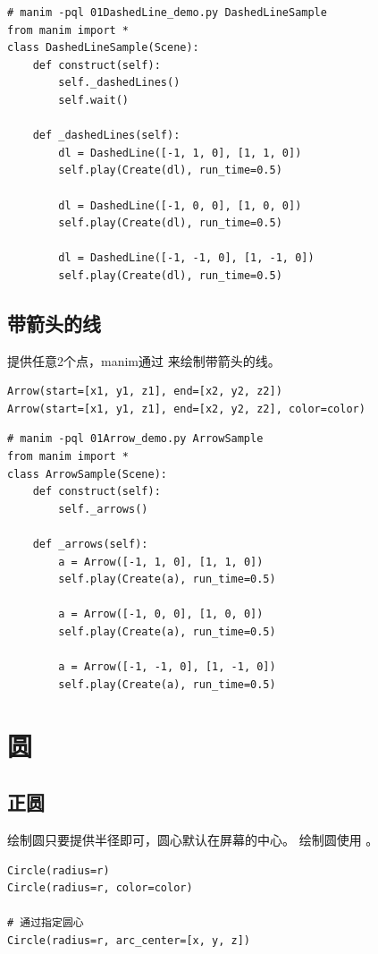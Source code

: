 \begin{lstlisting}[style=pythonstyle]
# manim -pql 01DashedLine_demo.py DashedLineSample    
from manim import *
class DashedLineSample(Scene):
    def construct(self):
        self._dashedLines()
        self.wait()

    def _dashedLines(self):
        dl = DashedLine([-1, 1, 0], [1, 1, 0])
        self.play(Create(dl), run_time=0.5)

        dl = DashedLine([-1, 0, 0], [1, 0, 0])
        self.play(Create(dl), run_time=0.5)

        dl = DashedLine([-1, -1, 0], [1, -1, 0])
        self.play(Create(dl), run_time=0.5)
\end{lstlisting}

\subsection{带箭头的线}
提供任意2个点，manim通过  来绘制带箭头的线。
\begin{lstlisting}[style=demostyle,numbers=none]
Arrow(start=[x1, y1, z1], end=[x2, y2, z2])
Arrow(start=[x1, y1, z1], end=[x2, y2, z2], color=color)
\end{lstlisting}

\begin{lstlisting}[style=pythonstyle]
# manim -pql 01Arrow_demo.py ArrowSample    
from manim import *
class ArrowSample(Scene):
    def construct(self):
        self._arrows()  

    def _arrows(self):
        a = Arrow([-1, 1, 0], [1, 1, 0])  
        self.play(Create(a), run_time=0.5)

        a = Arrow([-1, 0, 0], [1, 0, 0])  
        self.play(Create(a), run_time=0.5)

        a = Arrow([-1, -1, 0], [1, -1, 0])  
        self.play(Create(a), run_time=0.5)
\end{lstlisting}


\section{圆}
\subsection{正圆}
绘制圆只要提供半径即可，圆心默认在屏幕的中心。 绘制圆使用 。
\begin{lstlisting}[style=demostyle,numbers=none]
Circle(radius=r)
Circle(radius=r, color=color)

# 通过指定圆心
Circle(radius=r, arc_center=[x, y, z])
\end{lstlisting}

